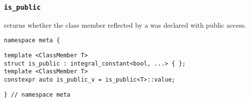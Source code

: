 
\subsubsection{\texttt{is\_public}}

returns whether the class member reflected by a  was declared with public access.

\begin{verbatim}
namespace meta {
\end{verbatim}
\begin{verbatim}
template <ClassMember T>
struct is_public : integral_constant<bool, ...> { };
template <ClassMember T>
constexpr auto is_public_v = is_public<T>::value;
\end{verbatim}
\begin{verbatim}
} // namespace meta
\end{verbatim}
